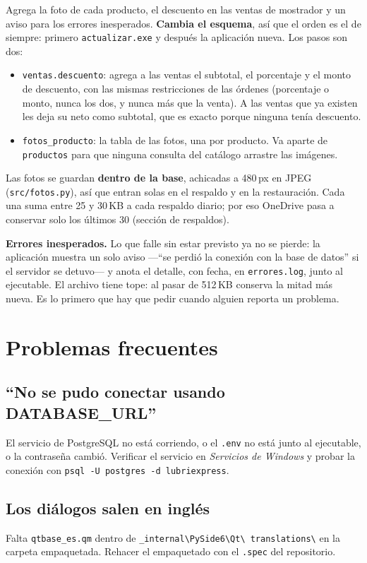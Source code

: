\documentclass[11pt,a4paper]{article}
\begin{document}
Agrega la foto de cada producto, el descuento en las ventas de mostrador y un
aviso para los errores inesperados. \textbf{Cambia el esquema}, así que el orden
es el de siempre: primero \texttt{actualizar.exe} y después la aplicación nueva.
Los pasos son dos:

\begin{itemize}
  \item \texttt{ventas.descuento}: agrega a las ventas el subtotal, el
        porcentaje y el monto de descuento, con las mismas restricciones de las
        órdenes (porcentaje o monto, nunca los dos, y nunca más que la venta).
        A las ventas que ya existen les deja su neto como subtotal, que es
        exacto porque ninguna tenía descuento.
  \item \texttt{fotos\_producto}: la tabla de las fotos, una por producto.
        Va aparte de \texttt{productos} para que ninguna consulta del catálogo
        arrastre las imágenes.
\end{itemize}

Las fotos se guardan \textbf{dentro de la base}, achicadas a 480\,px en JPEG
(\texttt{src/fotos.py}), así que entran solas en el respaldo y en la
restauración. Cada una suma entre 25 y 30\,KB a cada respaldo diario; por eso
OneDrive pasa a conservar solo los últimos 30 (sección de respaldos).

\textbf{Errores inesperados.} Lo que falle sin estar previsto ya no se pierde: la
aplicación muestra un solo aviso ---``se perdió la conexión con la base de
datos'' si el servidor se detuvo--- y anota el detalle, con fecha, en
\texttt{errores.log}, junto al ejecutable. El archivo tiene tope: al pasar de
512\,KB conserva la mitad más nueva. Es lo primero que hay que pedir cuando
alguien reporta un problema.

\section{Problemas frecuentes}

\subsection*{``No se pudo conectar usando DATABASE\_URL''}
El servicio de PostgreSQL no está corriendo, o el \texttt{.env} no está junto al
ejecutable, o la contraseña cambió. Verificar el servicio en
\emph{Servicios de Windows} y probar la conexión con
\texttt{psql -U postgres -d lubriexpress}.

\subsection*{Los diálogos salen en inglés}
Falta \texttt{qtbase\_es.qm} dentro de
\texttt{\_internal\textbackslash PySide6\textbackslash Qt\textbackslash
translations\textbackslash} en la carpeta empaquetada. Rehacer el empaquetado
con el \texttt{.spec} del repositorio.
\end{document}
